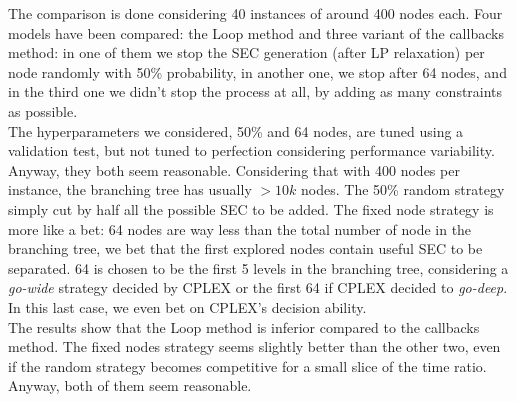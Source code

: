 The comparison is done considering 40 instances of around 400 nodes each. Four
models have been compared: the Loop method and three variant of the callbacks
method: in one of them we stop the SEC generation (after LP relaxation) per node
randomly with 50\% probability, in another one, we stop after 64 nodes, and in
the third one we didn't stop the process at all, by adding as many constraints
as possible.\\
The hyperparameters we considered, 50\% and 64 nodes, are tuned using a
validation test, but not tuned to perfection considering performance
variability. Anyway, they both seem reasonable. Considering that with 400 nodes
per instance, the branching tree has usually $>10k$ nodes. The 50\% random
strategy simply cut by half all the possible SEC to be added. The fixed node
strategy is more like a bet: 64 nodes are way less than the total number of node
in the branching tree, we bet that the first explored nodes contain useful SEC to
be separated. 64 is chosen to be the first 5 levels in the branching tree,
considering a \emph{go-wide} strategy decided by CPLEX or the first 64 if CPLEX
decided to \emph{go-deep}. In this last case, we even bet on CPLEX's decision
ability.\\

The results show that the Loop method is inferior compared to the callbacks
method. The fixed nodes strategy seems slightly better than the other two, even
if the random strategy becomes competitive for a small slice of the time ratio. 
Anyway, both of them seem reasonable.
